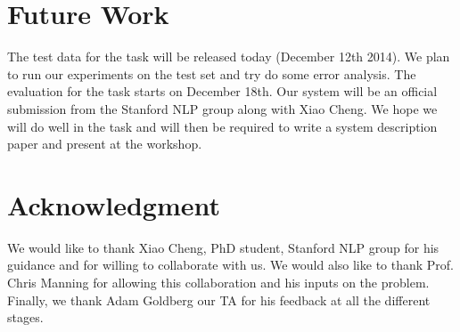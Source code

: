 \documentclass[conference]{IEEEtran}
\begin{document}
\section{Future Work}
The test data for the task will be released today (December 12th 2014). We plan to run our experiments on the test set and try do some error analysis. The evaluation for the task starts on December 18th. Our system will be an official submission from the Stanford NLP group along with Xiao Cheng. We hope we will do well in the task and will then be required to write a system description paper and present at the workshop.\\


\section{Acknowledgment}
We would like to thank Xiao Cheng, PhD student, Stanford NLP group for his guidance and for willing to collaborate with us. We would also like to thank Prof. Chris Manning for allowing this collaboration and his inputs on the problem. Finally, we thank Adam Goldberg our TA for his feedback at all the different stages.\\

\end{document}
